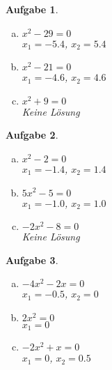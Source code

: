 \documentclass[12pt]{article}
\theoremstyle{note}
\newtheorem{aufgabe}{Aufgabe}
\begin{document}
\begin{flushleft}
\begin{aufgabe} ~ \ 
\begin{multicols}{3} 
\begin{enumerate}[a)] 
\item $x^{2} - 29 = 0$\\
{\tiny $x_1=$$-5.4$}{\tiny   ,     $ x_2=$$5.4$}

\item $x^{2} - 21 = 0$\\
{\tiny $x_1=$$-4.6$}{\tiny   ,     $ x_2=$$4.6$}

\item $x^{2} + 9 = 0$\\
{\tiny Keine Lösung}

\end{enumerate} 
\end{multicols} 
\end{aufgabe}\vspace{1em}\begin{aufgabe} ~ \ 
\begin{multicols}{3} 
\begin{enumerate}[a)] 
\item $x^{2} - 2 = 0$\\
{\tiny $x_1=$$-1.4$}{\tiny   ,     $ x_2=$$1.4$}

\item $5 x^{2} - 5 = 0$\\
{\tiny $x_1=$$-1.0$}{\tiny   ,     $ x_2=$$1.0$}

\item $- 2 x^{2} - 8 = 0$\\
{\tiny Keine Lösung}

\end{enumerate} 
\end{multicols} 
\end{aufgabe}\vspace{1em}\begin{aufgabe} ~ \ 
\begin{multicols}{3} 
\begin{enumerate}[a)] 
\item $- 4 x^{2} - 2 x = 0$\\
{\tiny $x_1=$$-0.5$}{\tiny   ,   $ x_2=$$0$}

\item $2 x^{2} = 0$\\
{\tiny $x_1=$$0$}

\item $- 2 x^{2} + x = 0$\\
{\tiny $x_1=$$0$}{\tiny   ,   $ x_2=$$0.5$}


\end{enumerate}
\end{multicols}
\end{aufgabe}
\end{flushleft}
\end{document}
